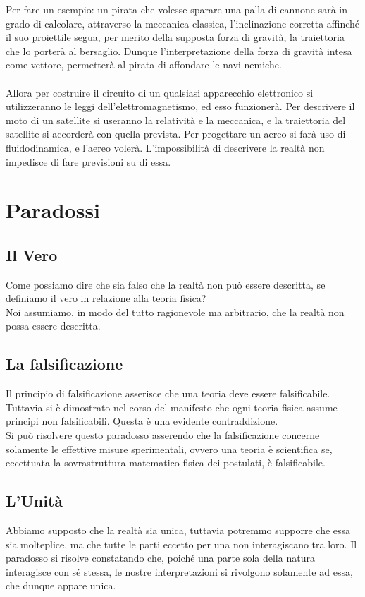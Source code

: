 \documentclass[]{article}
\begin{document}
	Per fare un esempio: un pirata che volesse sparare una palla di cannone sarà in grado di calcolare, attraverso la meccanica classica, l'inclinazione corretta affinché il suo proiettile segua, per merito della supposta forza di gravità, la traiettoria che lo porterà al bersaglio. Dunque l'interpretazione della forza di gravità intesa come vettore, permetterà al pirata di affondare le navi nemiche.   
	\\
	\\
	Allora per costruire il circuito di un qualsiasi apparecchio elettronico si utilizzeranno le leggi dell'elettromagnetismo, ed esso funzionerà. Per descrivere il moto di un satellite si useranno la relatività e la meccanica, e la traiettoria del satellite si accorderà con quella prevista. Per progettare un aereo si farà uso di fluidodinamica, e l'aereo volerà.  
	L'impossibilità di descrivere la realtà non impedisce di fare previsioni su di essa.
	\section{Paradossi}
	\subsection{Il Vero}
	Come possiamo dire che sia falso che la realtà non può essere descritta, se definiamo il vero in relazione alla teoria fisica?\\
	Noi assumiamo, in modo del tutto ragionevole ma arbitrario, che la realtà non possa essere descritta.
	\subsection{La falsificazione}
	Il principio di falsificazione asserisce che una teoria deve essere falsificabile. Tuttavia si è dimostrato nel corso del manifesto che ogni teoria fisica assume principi non falsificabili. Questa è una evidente contraddizione.\\
	Si può risolvere questo paradosso asserendo che la falsificazione concerne solamente le effettive misure sperimentali, ovvero una teoria è scientifica se, eccettuata la sovrastruttura matematico-fisica dei postulati, è falsificabile.
	\subsection{L'Unità}
	Abbiamo supposto che la realtà sia unica, tuttavia potremmo supporre che essa sia molteplice, ma che tutte le parti eccetto per una non interagiscano tra loro.
	Il paradosso si risolve constatando che, poiché una parte sola della natura interagisce con sé stessa, le nostre interpretazioni si rivolgono solamente ad essa, che dunque appare unica.
\end{document}
